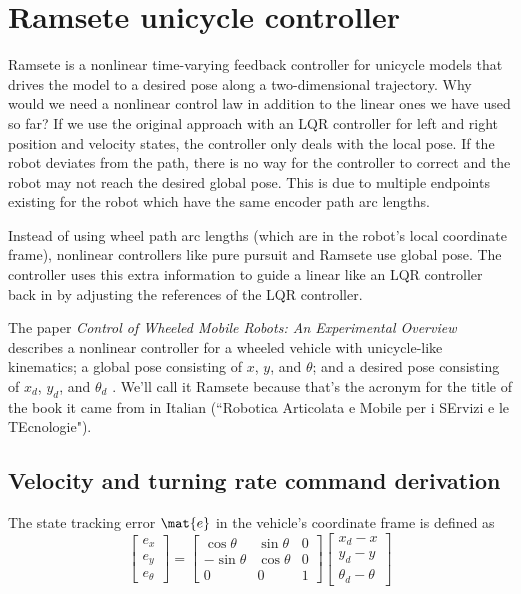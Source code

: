 \section{Ramsete unicycle controller}

Ramsete is a nonlinear time-varying feedback controller for unicycle
\glspl{model} that drives the \gls{model} to a desired \gls{pose} along a
two-dimensional trajectory. Why would we need a nonlinear control law in
addition to the linear ones we have used so far? If we use the original approach
with an LQR \gls{controller} for left and right position and velocity
\glspl{state}, the \gls{controller} only deals with the local \gls{pose}. If the
robot deviates from the path, there is no way for the \gls{controller} to
correct and the robot may not reach the desired global \gls{pose}. This is due
to multiple endpoints existing for the robot which have the same encoder path
arc lengths.

Instead of using wheel path arc lengths (which are in the robot's local
coordinate frame), nonlinear controllers like pure pursuit and Ramsete use
global pose. The \gls{controller} uses this extra information to guide a linear
 like an LQR \gls{controller} back in by
adjusting the \glspl{reference} of the LQR \gls{controller}.

The paper \textit{Control of Wheeled Mobile Robots: An Experimental Overview}
describes a nonlinear controller for a wheeled vehicle with unicycle-like
kinematics; a global \gls{pose} consisting of $x$, $y$, and $\theta$; and a
desired \gls{pose} consisting of $x_d$, $y_d$, and $\theta_d$
\cite{bib:ctrl_wheeled_mobile_robots}. We'll call it Ramsete because that's the
acronym for the title of the book it came from in Italian (``Robotica Articolata
e Mobile per i SErvizi e le TEcnologie").

\subsection{Velocity and turning rate command derivation}

The \gls{state} tracking \gls{error} $\mat{e}$ in the vehicle's coordinate frame
is defined as
\begin{equation*}
  \begin{bmatrix}
    e_x \\
    e_y \\
    e_\theta
  \end{bmatrix} =
  \begin{bmatrix}
    \cos\theta & \sin\theta & 0 \\
    -\sin\theta & \cos\theta & 0 \\
    0 & 0 & 1
  \end{bmatrix}
  \begin{bmatrix}
    x_d - x \\
    y_d - y \\
    \theta_d - \theta
  \end{bmatrix}
\end{equation*}

